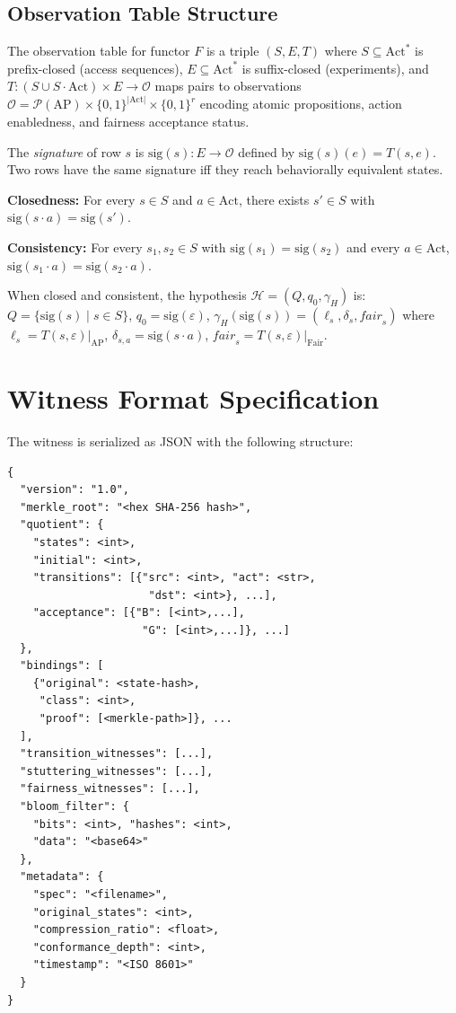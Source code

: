 \documentclass[11pt]{article}
\newcommand{\Pow}{\mathcal{P}}
\newcommand{\Fair}{\ensuremath{\mathrm{Fair}}}
\newcommand{\Act}{\ensuremath{\mathrm{Act}}}
\newcommand{\AP}{\ensuremath{\mathrm{AP}}}
\begin{document}
\subsection{Observation Table Structure}

The observation table for functor $F$ is a triple $(S, E, T)$ where
$S \subseteq \Act^*$ is prefix-closed (access sequences),
$E \subseteq \Act^*$ is suffix-closed (experiments), and
$T : (S \cup S \cdot \Act) \times E \to \mathcal{O}$ maps pairs to
observations $\mathcal{O} = \Pow(\AP) \times \{0,1\}^{|\Act|} \times
\{0,1\}^r$ encoding atomic propositions, action enabledness, and
fairness acceptance status.

The \emph{signature} of row $s$ is $\mathrm{sig}(s) : E \to \mathcal{O}$
defined by $\mathrm{sig}(s)(e) = T(s, e)$.
Two rows have the same signature iff they reach behaviorally equivalent
states.

\textbf{Closedness:} For every $s \in S$ and $a \in \Act$, there exists
$s' \in S$ with $\mathrm{sig}(s \cdot a) = \mathrm{sig}(s')$.

\textbf{Consistency:} For every $s_1, s_2 \in S$ with
$\mathrm{sig}(s_1) = \mathrm{sig}(s_2)$ and every $a \in \Act$,
$\mathrm{sig}(s_1 \cdot a) = \mathrm{sig}(s_2 \cdot a)$.

When closed and consistent, the hypothesis $\mathcal{H} = (Q, q_0, \gamma_H)$
is:
$Q = \{\mathrm{sig}(s) \mid s \in S\}$,
$q_0 = \mathrm{sig}(\varepsilon)$,
$\gamma_H(\mathrm{sig}(s)) = (\ell_s, \delta_s, \mathit{fair}_s)$ where
$\ell_s = T(s, \varepsilon)|_{\AP}$,
$\delta_{s,a} = \mathrm{sig}(s \cdot a)$,
$\mathit{fair}_s = T(s, \varepsilon)|_{\Fair}$.


\section{Witness Format Specification}
\label{app:witness}

The witness is serialized as JSON with the following structure:

\begin{lstlisting}[language={}]
{
  "version": "1.0",
  "merkle_root": "<hex SHA-256 hash>",
  "quotient": {
    "states": <int>,
    "initial": <int>,
    "transitions": [{"src": <int>, "act": <str>,
                      "dst": <int>}, ...],
    "acceptance": [{"B": [<int>,...],
                     "G": [<int>,...]}, ...]
  },
  "bindings": [
    {"original": <state-hash>,
     "class": <int>,
     "proof": [<merkle-path>]}, ...
  ],
  "transition_witnesses": [...],
  "stuttering_witnesses": [...],
  "fairness_witnesses": [...],
  "bloom_filter": {
    "bits": <int>, "hashes": <int>,
    "data": "<base64>"
  },
  "metadata": {
    "spec": "<filename>",
    "original_states": <int>,
    "compression_ratio": <float>,
    "conformance_depth": <int>,
    "timestamp": "<ISO 8601>"
  }
}
\end{lstlisting}
\end{document}
